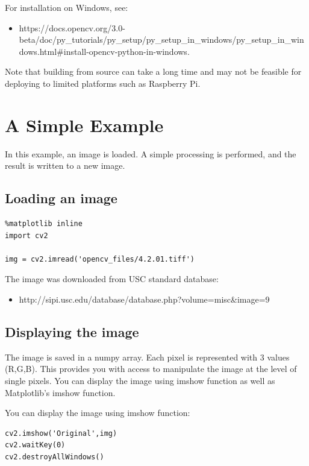 For installation on Windows, see:

\begin{itemize}
\tightlist
\item
  https://docs.opencv.org/3.0-beta/doc/py\_tutorials/py\_setup/py\_setup\_in\_windows/py\_setup\_in\_windows.html\#install-opencv-python-in-windows.
\end{itemize}

Note that building from source can take a long time and may not be
feasible for deploying to limited platforms such as Raspberry Pi.

\section{A Simple Example}\label{a-simple-example}

In this example, an image is loaded. A simple processing is performed,
and the result is written to a new image.

\subsection{Loading an image}\label{loading-an-image}

\begin{verbatim}
%matplotlib inline
import cv2

img = cv2.imread('opencv_files/4.2.01.tiff') 
\end{verbatim}

The image was downloaded from USC standard database:

\begin{itemize}
\tightlist
\item
  http://sipi.usc.edu/database/database.php?volume=misc\&image=9
\end{itemize}

\subsection{Displaying the image}\label{displaying-the-image}

The image is saved in a numpy array. Each pixel is represented with 3
values (R,G,B). This provides you with access to manipulate the image at
the level of single pixels. You can display the image using imshow
function as well as Matplotlib's imshow function.

You can display the image using imshow function:

\begin{verbatim}
cv2.imshow('Original',img)
cv2.waitKey(0)
cv2.destroyAllWindows()
\end{verbatim}

